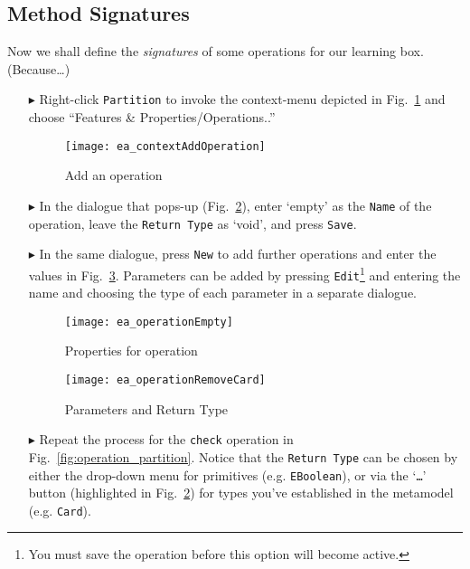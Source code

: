 \newpage
\subsection{Method Signatures}
\visHeader
\hypertarget{static:methods vis}{}

Now we shall define the \emph{signatures} of some operations for our learning box. (Because\ldots)

\begin{enumerate}
  
\item[$\blacktriangleright$] Right-click \texttt{Partition} to invoke the context-menu depicted in Fig.~\ref{fig:add_operation} and choose ``Features \&
Properties/Operations..''

\begin{figure}[htbp]
	\centering
  \texttt{[image: ea\_contextAddOperation]}
	\caption{Add an operation}
	\label{fig:add_operation}
\end{figure}
\FloatBarrier

\item[$\blacktriangleright$] In the dialogue that pops-up (Fig.~\ref{fig:operation_properties}), enter `empty' as the \texttt{Name} of the operation,
leave the \texttt{Return Type} as `void', and press \texttt{Save}.

\item[$\blacktriangleright$] In the same dialogue, press \texttt{New} to add further operations and enter the values in Fig.~\ref{fig:operation_parameters}. 
Parameters can be added by pressing \texttt{Edit}\footnote{You must save the operation before this option will become active.} and entering the name and
choosing the type of each parameter in a separate dialogue.

\begin{figure}[htbp]
	\centering
  	\texttt{[image: ea\_operationEmpty]}
	\caption{Properties for operation}
	\label{fig:operation_properties}
\end{figure}
\FloatBarrier

\begin{figure}[htbp]
	\centering
  \texttt{[image: ea\_operationRemoveCard]}
	\caption{Parameters and Return Type}
	\label{fig:operation_parameters}
\end{figure}
\FloatBarrier

\item[$\blacktriangleright$] Repeat the process for the \texttt{check} operation in Fig.~\ref{fig:operation_partition}. Notice that the \texttt{Return Type} can
be chosen by either the drop-down menu for primitives (e.g. \texttt{EBoolean}), or via the `\texttt{\ldots}' button (highlighted in
Fig.~\ref{fig:operation_properties}) for types you've established in the metamodel (e.g. \texttt{Card}).


\end{enumerate}
